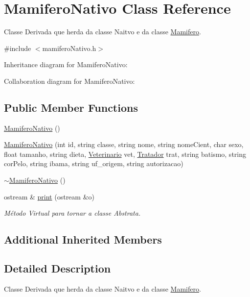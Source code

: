 \hypertarget{classMamiferoNativo}{}\section{Mamifero\+Nativo Class Reference}
\label{classMamiferoNativo}


Classe Derivada que herda da classe Naitvo e da classe \hyperlink{classMamifero}{Mamifero}.  




{\ttfamily \#include $<$mamifero\+Nativo.\+h$>$}



Inheritance diagram for Mamifero\+Nativo\+:


Collaboration diagram for Mamifero\+Nativo\+:
\subsection*{Public Member Functions}
\begin{DoxyCompactItemize}
\item 
\hyperlink{classMamiferoNativo_a6588fa54551bfa9df23749d2b2b00b05}{Mamifero\+Nativo} ()
\item 
\hyperlink{classMamiferoNativo_a46de75ac3827b1afa4e7794af70a80a8}{Mamifero\+Nativo} (int id, string classe, string nome, string nome\+Cient, char sexo, float tamanho, string dieta, \hyperlink{classVeterinario}{Veterinario} vet, \hyperlink{classTratador}{Tratador} trat, string batismo, string cor\+Pelo, string ibama, string uf\+\_\+origem, string autorizacao)
\item 
\hyperlink{classMamiferoNativo_aa08f523498d6713873a29747024e5717}{$\sim$\+Mamifero\+Nativo} ()
\item 
ostream \& \hyperlink{classMamiferoNativo_a0116235f807fb5a15ace63321d62518d}{print} (ostream \&o)
\begin{DoxyCompactList}\small\item\em Método Virtual para tornar a classe Abstrata. \end{DoxyCompactList}\end{DoxyCompactItemize}
\subsection*{Additional Inherited Members}


\subsection{Detailed Description}
Classe Derivada que herda da classe Naitvo e da classe \hyperlink{classMamifero}{Mamifero}. 

